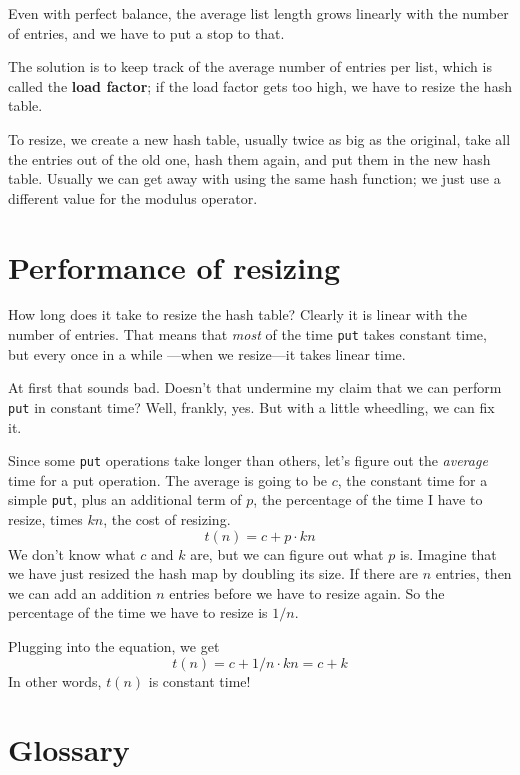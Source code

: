 Even with perfect balance, the average list length
grows linearly with the number of entries, and we have to put
a stop to that.

The solution is to keep track of the average number of entries
per list, which is called the {\bf load factor};
if the load factor gets too high, we have to resize the hash table.


To resize, we create a new hash table, usually twice as big as the
original, take all the entries out of the old one, hash them again,
and put them in the new hash table.  Usually we can get away with
using the same hash function; we just use a different value for the
modulus operator.


\section{Performance of resizing}

How long does it take to resize the hash table?  Clearly it is linear
with the number of entries.  That means that {\em most} of the
time {\tt put} takes constant time, but every once in a while
---when we resize---it takes linear time.

At first that sounds bad.  Doesn't that undermine my
claim that we can perform {\tt put} in constant time?  Well,
frankly, yes.  But with a little wheedling, we can fix it.

Since some {\tt put} operations take longer than others, let's
figure out the {\em average} time for a put operation.  The
average is going to be $c$, the constant time for a simple
{\tt put}, plus an additional term of $p$, the percentage of
the time I have to resize, times $kn$, the cost
of resizing.
%
\begin{equation}
t(n) = c + p \cdot kn
\end{equation}
%
We don't know what $c$ and $k$ are, but we can figure out what
$p$ is.  Imagine that we have just resized the hash map by
doubling its size.  If there are $n$ entries, then we can add an
addition $n$ entries before we have to resize again.  So the
percentage of the time we have to resize is $1/n$.

Plugging into the equation, we get
%
\begin{equation}
t(n) = c + 1/n \cdot kn = c + k
\end{equation}
%
In other words, $t(n)$ is constant time!


\section{Glossary}


